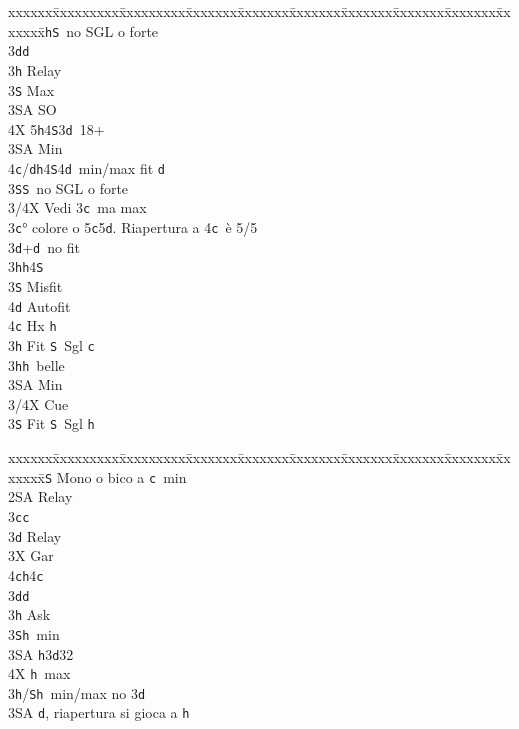 \documentclass[a4paper,italian]{article}
\newcommand{\BS}{\small{\texttt{S}}}
\newcommand{\BC}{\small{\texttt{c}}}
\newcommand{\BD}{\small{\texttt{d}}}
\newcommand{\BH}{\small{\texttt{h}}}
\newenvironment{bidtable}
{\begin{tabbing}

    xxxxxx\=xxxxxxxxx\=xxxxxxxxx\=xxxxxxx\=xxxxxxx\=xxxxxxx\=xxxxxxx\=xxxxxxx\=xxxxxxx\=xxxxxxx\=\kill}
{\end{tabbing} }%
\begin{document}
\begin{multicols}{2}
\begin{bidtable}
        3\BH {}\BS\ no SGL o forte\-\\
        3\BD {}\BD \+\\
        3\BH \> Relay\+\\
        3\BS \> Max\+\\
        3\small{SA} \> SO\+\\
        4X 5\BH 4\BS 3\BD\ 18+\-\-\\
        3\small{SA} \> Min\\
        4\BC/\BD {}\BH 4\BS 4\BD\ min/max fit \BD \-\\
        3\BS {}\BS\ no SGL o forte\-\\
        3/4X \> Vedi 3\BC\ ma max\-\\
        3\BC {}° colore o 5\BC 5\BD . Riapertura a 4\BC\ è 5/5\\
        3\BD {}+\BD\ no fit\+\\
        3\BH {}\BH 4\BS \+\\
        3\BS \> Misfit\\
        4\BD \> Autofit\\
        4\BC \> Hx \BH \-\-\\
        3\BH \> Fit \BS\ Sgl \BC \+\\
        3\BH {}\BH\ belle\\
        3\small{SA} \> Min\\
        3/4X \> Cue\-\\
        3\BS \> Fit \BS\ Sgl \BH \-\\
    \end{bidtable}
    \columnbreak
    \begin{bidtable}
        2\BS \> Mono o bico a \BC\ min\+\\
        2\small{SA} \> Relay\+\\
        3\BC {}\BC \+\\
        3\BD \> Relay\+\\
        3X \> Gar\\
        4\BC {}\BH 4\BC \-\-\\
        3\BD {}\BD \+\\
        3\BH \> Ask\+\\
        3\BS {}\BH\ min\\
        3\small{SA} \BH 3\BD 32\\
        4X \BH\ max\-\-\\
        3\BH/\BS {}\BH\ min/max no 3\BD \\
        3\small{SA} \BD , riapertura si gioca a \BH \-\\

\end{bidtable}
\end{multicols}
\end{document}
